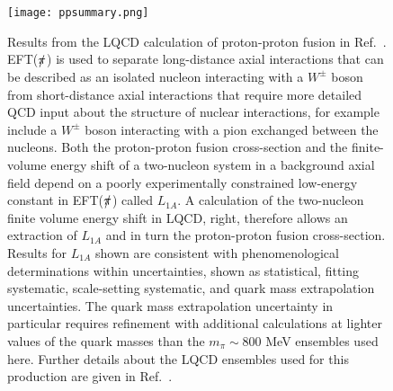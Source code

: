 \begin{figure}
  \begin{center}
  \texttt{[image: ppsummary.png]}
\end{center}
  \caption{
    Results from the LQCD calculation of proton-proton fusion in Ref.~\cite{Savage:2016kon}. 
    EFT($\slashed{\pi}$) is used to separate long-distance axial interactions that can be described as an isolated nucleon interacting with a $W^\pm$ boson from short-distance axial interactions that require more detailed QCD input about the structure of nuclear interactions, for example include a $W^\pm$ boson interacting with a pion exchanged between the nucleons.
    Both the proton-proton fusion cross-section and the finite-volume energy shift of a two-nucleon system in a background axial field depend on a poorly experimentally constrained low-energy constant in EFT($\slashed{\pi}$) called $L_{1A}$.
    A calculation of the two-nucleon finite volume energy shift in LQCD, right, therefore allows an extraction of $L_{1A}$ and in turn the proton-proton fusion cross-section.
    Results for $L_{1A}$ shown are consistent with phenomenological determinations within uncertainties, shown as statistical, fitting systematic, scale-setting systematic, and quark mass extrapolation uncertainties.
    The quark mass extrapolation uncertainty in particular requires refinement with additional calculations at lighter values of the quark masses than the $m_\pi \sim 800$ MeV ensembles used here.
    Further details about the LQCD ensembles used for this production are given in Ref.~\cite{Orginos:2015aya}.
  }
  \label{fig:plateau}
\end{figure}

